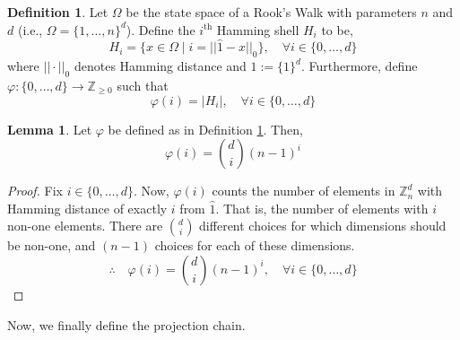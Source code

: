 \documentclass{article}
\theoremstyle{definition}
\newtheorem{definition}{Definition}
\theoremstyle{definition}
\theoremstyle{definition}
\newtheorem{lemma}{Lemma}
\theoremstyle{definition}
\theoremstyle{named}
\begin{document}
\begin{definition}
   \label{defphi}
   Let $\Omega$ be the state space of a Rook's Walk with parameters $n$ and $d$ (i.e., $\Omega=\{1,\dots, n\}^d$). Define the $i^\text{th}$ Hamming shell $H_i$ to be,
   \[H_i = \{x\in \Omega \mid i= ||\hat{1}-x||_0\}, \quad \forall i\in \{0,\dots,d\}\]
   where $||\cdot||_0$ denotes Hamming distance and $\hat{1}:=\{1\}^d$. Furthermore, define $\varphi : \{0,\dots,d\} \to \mathbb{Z}_{\geq 0}$ such that 
   \[\varphi(i) = |H_i|, \quad  \forall i\in \{0,\dots,d\}\]
\end{definition}
\begin{lemma}
   Let $\varphi$ be defined as in Definition \ref{defphi}. Then,
   \[\varphi(i) = {d \choose i}(n-1)^i\]
   \begin{proof}
      Fix $i \in \{0,\dots,d\}$. Now, $\varphi(i)$ counts the number of elements in $\mathbb{Z}_n^d$ with Hamming distance of exactly $i$ from $\hat{1}$. That is, the number of elements with $i$ non-one elements. There are ${d \choose i}$ different choices for which dimensions should be non-one, and $(n-1)$ choices for each of these dimensions. 
   \[\therefore \quad \varphi(i) = {d \choose i}(n-1)^i,\quad \forall i \in \{0,\dots,d\}\]
   \end{proof}
\end{lemma}
\noindent Now, we finally define the projection chain.
\end{document}

